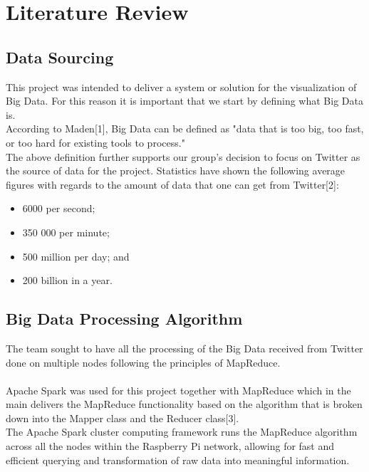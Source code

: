 \documentclass[12pt]{article} %
\begin{document}
		
	\section{Literature Review}
	
	\subsection {Data Sourcing}
	
	This project was intended to deliver a system or solution for the visualization of Big Data. For this reason it is important that we start by defining what Big Data is.
	\\
	According to Maden[1], Big Data can be defined as "data that is too big, too fast, or too hard for existing tools to process."
	\\
	The above definition further supports our group's decision to focus on Twitter as the source of data for the project. Statistics have shown the following average figures with regards to the amount of data that one can get from Twitter[2]:
	\\
	
		\begin{itemize}
			\item 6000 per second; 
			\item 350 000 per minute;
			\item 500 million per day; and
			\item 200 billion in a year.
		\end{itemize}
	
	\subsection {Big Data Processing Algorithm}
	
	The team sought to have all the processing of the Big Data received from Twitter done on multiple nodes following the principles of MapReduce.
	\\
	\\
	Apache Spark was used for this project together with MapReduce which in the main delivers the MapReduce functionality based on the algorithm that is broken down into the Mapper class and the Reducer class[3].\\
	
	The Apache Spark cluster computing framework runs the MapReduce algorithm across all the nodes within the Raspberry Pi network, allowing for fast and efficient querying and transformation of raw data into meaningful information.
	
\end{document}
